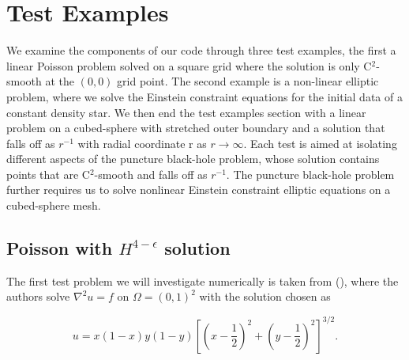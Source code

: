 \section{Test Examples}

\label{sec:testexamples}
We examine the components of our code through three test examples, the first a linear Poisson problem solved on a square grid where the solution is only C$^{2}$-smooth at the $(0,0)$ grid point. The second example is a non-linear elliptic problem, where we solve the Einstein constraint equations for the initial data of a constant density star. We then end the test examples section with a linear problem on a cubed-sphere with stretched outer boundary and a solution that falls off as $r^{-1}$ with radial coordinate r as $r \rightarrow \infty$. Each test is aimed at isolating different aspects of the puncture black-hole problem, whose solution contains points that are C$^{2}$-smooth and falls off as $r^{-1}$. The puncture black-hole problem further requires us to solve nonlinear Einstein constraint elliptic equations on a cubed-sphere mesh.

\subsection{Poisson with $H^{4-\epsilon}$ solution}

The first test problem we will investigate numerically is taken from (\citet*{stamm2010hp}), where the authors solve $\nabla^{2}u = f$ on $\Omega = (0,1)^{2}$ with the solution chosen as

\begin{equation}
    \label{eq:testexample1solution}
 u = x\left(1-x\right)y\left(1-y\right)\left[\left(x-\frac{1}{2}\right)^2 + \left(y-\frac{1}{2}\right)^2\right]^{3/2}.
\end{equation}

